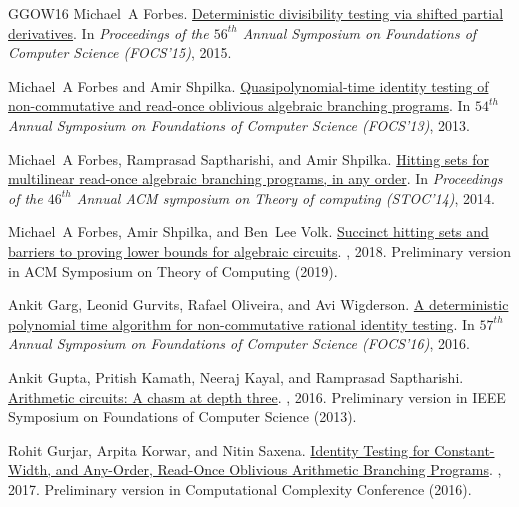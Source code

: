 \documentclass[10pt,a4paper]{article}
\numberwithin{equation}{section}
\begin{document}
\begin{thebibliography}{GGOW16}
Michael~A Forbes.
\newblock \href{https://ieeexplore.ieee.org/document/7354409/}{Deterministic
  divisibility testing via shifted partial derivatives}.
\newblock In {\em Proceedings of the $56^{th}$ Annual Symposium on Foundations
  of Computer Science (FOCS'15)}, 2015.

Michael~A Forbes and Amir Shpilka.
\newblock
  \href{https://ieeexplore.ieee.org/document/6686160/}{Quasipolynomial-time
  identity testing of non-commutative and read-once oblivious algebraic
  branching programs}.
\newblock In {\em $54^{th}$ Annual Symposium on Foundations of Computer Science
  (FOCS'13)}, 2013.

Michael~A Forbes, Ramprasad Saptharishi, and Amir Shpilka.
\newblock \href{https://dl.acm.org/doi/10.1145/2591796.2591816}{Hitting sets
  for multilinear read-once algebraic branching programs, in any order}.
\newblock In {\em Proceedings of the $46^{th}$ Annual ACM symposium on Theory
  of computing (STOC'14)}, 2014.

Michael~A Forbes, Amir Shpilka, and Ben~Lee Volk.
\newblock \href{https://theoryofcomputing.org/articles/v014a018/}{Succinct
  hitting sets and barriers to proving lower bounds for algebraic circuits}.
, 2018.
\newblock Preliminary version in ACM Symposium on Theory of Computing (2019).

Ankit Garg, Leonid Gurvits, Rafael Oliveira, and Avi Wigderson.
\newblock \href{https://ieeexplore.ieee.org/document/7782923}{A deterministic
  polynomial time algorithm for non-commutative rational identity testing}.
\newblock In {\em $57^{th}$ Annual Symposium on Foundations of Computer Science
  (FOCS'16)}, 2016.

Ankit Gupta, Pritish Kamath, Neeraj Kayal, and Ramprasad Saptharishi.
\newblock \href{https://epubs.siam.org/doi/pdf/10.1137/140957123}{Arithmetic
  circuits: A chasm at depth three}.
, 2016.
\newblock Preliminary version in IEEE Symposium on Foundations of Computer Science (2013).

Rohit Gurjar, Arpita Korwar, and Nitin Saxena.
\newblock \href{http://dx.doi.org/10.4086/toc.2017.v013a002}{Identity Testing
  for Constant-Width, and Any-Order, Read-Once Oblivious Arithmetic Branching
  Programs}.
, 2017.
\newblock Preliminary version in Computational Complexity Conference (2016).


\end{thebibliography}
\end{document}

